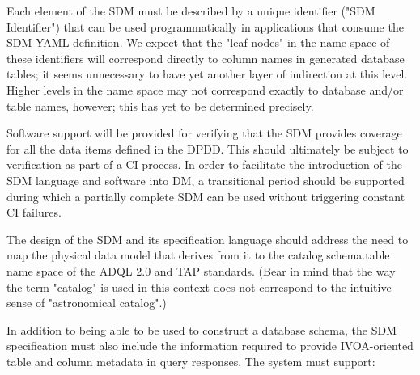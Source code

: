 Each element of the SDM must be described by a unique identifier ("SDM Identifier") that can be used programmatically in applications that consume the SDM YAML definition.  We expect that the "leaf nodes" in the name space of these identifiers will correspond directly to column names in generated database tables; it seems unnecessary to have yet another layer of indirection at this level.  Higher levels in the name space may not correspond exactly to database and/or table names, however; this has yet to be determined precisely.

Software support will be provided for verifying that the SDM provides coverage for all the data items defined in the DPDD.  This should ultimately be subject to verification as part of a CI process.  In order to facilitate the introduction of the SDM language and software into DM, a transitional period should be supported during which a partially complete SDM can be used without triggering constant CI failures.

The design of the SDM and its specification language should address the need to map the physical data model that derives from it to the catalog.schema.table name space of the ADQL 2.0 and TAP standards.  (Bear in mind that the way the term "catalog" is used in this context does not correspond to the intuitive sense of "astronomical catalog".)

In addition to being able to be used to construct a database schema, the SDM specification must also include the information required to provide IVOA-oriented table and column metadata in query responses.  The system must support:
